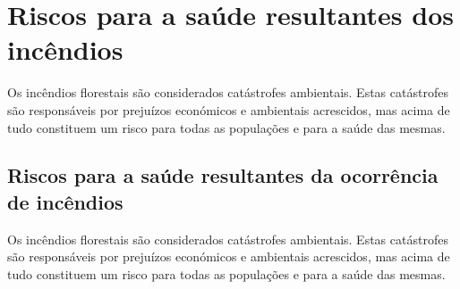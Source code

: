 \documentclass[a4paper,11pt]{report}
\begin{document}
\part{Riscos para a saúde resultantes dos incêndios}
Os incêndios florestais são considerados catástrofes ambientais. Estas catástrofes são responsáveis por prejuízos económicos e ambientais acrescidos, mas acima de tudo constituem um risco para todas as populações e para a saúde das mesmas.

\chapter{Riscos para a saúde resultantes da ocorrência de incêndios}

Os incêndios florestais são considerados catástrofes ambientais. Estas catástrofes são responsáveis por prejuízos económicos e ambientais acrescidos, mas acima de tudo constituem um risco para todas as populações e para a saúde das mesmas.
\end{document}

